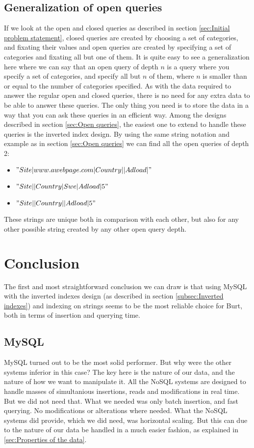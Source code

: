 \section{Generalization of open queries}
If we look at the open and closed queries as described in section \ref{sec:Initial problem statement}, closed queries are created by choosing a set of categories, and fixating their values and open queries are created by specifying a set of categories and fixating all but one of them. It is quite easy to see a generalization here where we can say that an open query of depth $n$ is a query where you specify a set of categories, and specify all but $n$ of them, where $n$ is smaller than or equal to the number of categories specified. As with the data required to answer the regular open and closed queries, there is no need for any extra data to be able to answer these queries. The only thing you need is to store the data in a way that you can ask these queries in an efficient way. Among the designs described in section \ref{sec:Open queries}, the easiest one to extend to handle these queries is the inverted index design. By using the same string notation and example as in section \ref{sec:Open queries} we can find all the open queries of depth 2:
\begin{itemize}
\item $"Site|www.awebpage.com|Country||Adload|"$
\item $"Site||Country|Swe|Adload|5"$
\item $"Site||Country||Adload|5"$
\end{itemize}

These strings are unique both in comparison with each other, but also for any other possible string created by any other open query depth. 

\pagebreak

\chapter{Conclusion}
The first and most straightforward conclusion we can draw is that using MySQL with the inverted indexes design (as described in section \ref{subsec:Inverted indexes}) and indexing on strings seems to be the most reliable choice for Burt, both in terms of insertion and querying time.

\section{MySQL}
MySQL turned out to be the most solid performer. But why were the other systems inferior in this case? The key here is the nature of our data, and the nature of how we want to manipulate it. All the NoSQL systems are designed to handle masses of simultanious insertions, reads and modifications in real time. But we did not need that. What we needed was only batch insertion, and fast querying. No modifications or alterations where needed. What the NoSQL systems did provide, which we did need, was horizontal scaling. But this can due to the nature of our data be handled in a much easier fashion, as explained in \ref{sec:Properties of the data}.

